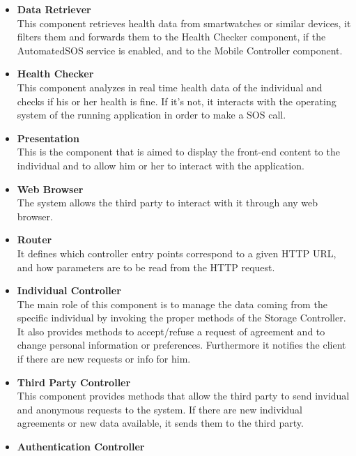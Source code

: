 \begin{legal}
\begin{itemize}
		\item{\textbf{Data Retriever}\\
		This component retrieves health data from smartwatches or similar devices, it filters them and forwards them to the Health Checker component, if the AutomatedSOS service is enabled, and to the Mobile Controller component.
				}\\
		\item{\textbf{Health Checker}\\
		This component analyzes in real time health data of the individual and checks if his or her health is fine. If it's not, it interacts with the operating system of the running application in order to make a SOS call.
				}\\
		\item{\textbf{Presentation}\\
		This is the component that is aimed to display the front-end content to the individual and to allow him or her to interact with the application.
				}\\
		\item{\textbf{Web Browser}\\
		The system allows the third party to interact with it through any web browser.
				}\\
		\item{\textbf{Router}\\
		It defines which controller entry points correspond to a given HTTP URL, and how parameters are to be read from the HTTP request.
				}\\
		\item{\textbf{Individual Controller}\\
		The main role of this component is to manage the data coming from the specific individual by invoking the proper methods of the Storage Controller. It also provides methods to accept/refuse a request of agreement and to change personal information or preferences. Furthermore it notifies the client if there are new requests or info for him.
				}\\
		\item{\textbf{Third Party Controller}\\
		This component provides methods that allow the third party to send invidual and anonymous requests to the system. If there are new individual agreements or new data available, it sends them to the third party.
				}\\
		\item{\textbf{Authentication Controller}\\
}
\end{itemize}
\end{legal}
